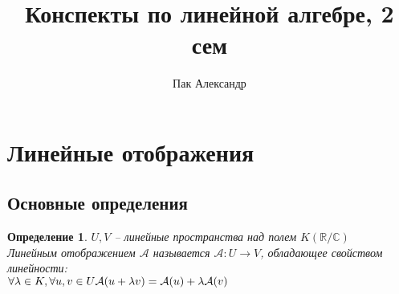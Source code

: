 \documentclass[12pt]{article}
\title{Конспекты по линейной алгебре, 2 сем}
\author{Пак Александр}
\newtheorem{defin}{Определение}[subsection]
\theoremstyle{remark}
\theoremstyle{definition}
\newcommand{\R}{\mathbb R}
\newcommand{\0}{\mathbb{0}}
\newcommand{\A}{\mathcal{A}}
\begin{document}
	\maketitle
	\newpage
	\setcounter{section}{6}
	\tableofcontents
	\newpage
	
	\section{Линейные отображения}
	
	\subsection{Основные определения}
	\begin{defin}
		$U, V$ -- линейные пространства над полем $K(\R/ \mathbb{C})$\\
		Линейным отображением $\A$ называется $\A: U \rightarrow V$, обладающее свойством линейности:\\
		$\forall \lambda \in K, \forall u, v \in U\\ 
		\A(u + \lambda v) = \A(u) + \lambda \A(v)$
	\end{defin}
	
\end{document}
